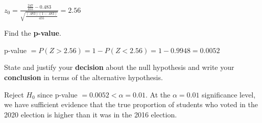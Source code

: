 \documentclass[noanswers]{exam}
\begin{document}
\begin{questions}
\begin{solution}[\stretch{1}]

\vspace{1mm}

$z_0=\displaystyle\frac{\frac{247}{455}-0.483}{\sqrt{\frac{(.483)(1-.483)}{455}}}=2.56$
\vspace{1mm}

\end{solution}

\question Find the \textbf{p-value}.

\begin{solution}[\stretch{1}]

\vspace{1mm}

p-value $=P(Z>2.56)=1-P(Z<2.56)=1-0.9948=0.0052$

\vspace{1mm}

\end{solution}

\question State and justify your \textbf{decision} about the null hypothesis and write your \textbf{conclusion} in terms of the alternative hypothesis.

\begin{solution}[\stretch{1}]

\vspace{1mm}

Reject $H_0$ since p-value $=0.0052<\alpha=0.01$. At the $\alpha=0.01$ significance level, we have sufficient evidence that the true proportion of students who voted in the 2020 election is higher than it was in the 2016 election. 

\vspace{1mm}

\end{solution}


\end{questions}
\end{document}
